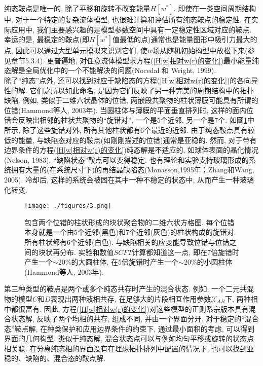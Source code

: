 纯态鞍点是唯一的, 除了平移和旋转不改变能量$H[w^*]$. 即使在一类空间周期结构中, 对于一个特定的复杂流体模型, 也很难计算和评估所有纯态鞍点的稳定性. 在实际应用中, 我们主要感兴趣的是模型参数空间中具有一定稳定性区域对应的鞍点. 幸运的是, 最稳定的鞍点(即$H[w^*]$值最低的点)通常也是能量图形中吸引力最大的点, 因此可以通过大型单元模拟来识别它们, 使$w$场从随机初始构型中放松下来(参见章节5.3.4). 更普遍地, 对任意流体模型求方程(\ref{H[w]相对w(r)的变化})最小能量纯态解是全局优化中的一个不能解决的问题(Nocedal 和 Wright, 1999). \\

除了“纯态”点外, 还可以找到对应于缺陷态的方程(\ref{H[w]相对w(r)的变化})的各向异性的解. 它们之所以如此命名, 是因为它们反映了另一种完美的周期结构中的拓扑缺陷. 例如, 类似于二维六状晶体的位错, 两嵌段共聚物的柱状薄膜可能具有所谓的位错(Hammond等人, 2003年). 当圆柱体与薄膜的平面垂直排列时, 这样的面内位错会反映出相邻的柱状共聚物的“旋错对”, 一个是5个近邻, 另一个是7个. 如圖\ref{方格图}中所示, 除了这些旋错对外, 所有其他柱状都有6个最近的近邻. 由于纯态鞍点具有较低的能量, 与缺陷态对应的鞍点(如刚刚描述的位错)通常是亚稳的. 然而, 对于带有边界条件的方程(\ref{H[w]相对w(r)的变化})纯态解是不适应的, 如球体表面的晶化情况(Nelson, 1983), “缺陷状态”鞍点可以变得稳定. 也有理论和实验支持玻璃形成的系统拥有大量的(在系统尺寸下)的再结晶缺陷态(Monasson,1995年；Zhang和Wang, 2005). 冷却后, 这样的系统会被困在其中一种不稳定的状态中, 从而产生一种玻璃化转变. \\
\begin{figure}[H]
        \centering
         \texttt{[image: ./figures/3.png]}
    \caption{包含两个位错的柱状形成的块状聚合物的二维六状方格图. 每个位错本身就是一个由5个近邻(黑色)和7个近邻(灰色)的柱状构成的旋错对. 所有柱状都有6个近邻(白色). 与缺陷相关的应变能导致位错与位错之间的块状再分布. 实验和数值$SCFT$计算都知道这一点, 即在7倍旋错时产生一个$\sim 20\%$的大圆柱体, 在5倍旋错时产生一个$\sim 20\%$的小圆柱体(Hammond等人, 2003年). } 
           \label{方格图}
\end{figure}


第三种类型的鞍点是两个或多个纯态共存时产生的混合状态. 例如, 一个二元共混物的模型$C$和$D$表现出两种液相共存, 在足够大的片段相互作用参数$\mathcal{X}_{AB}$下, 两种相中都很富有. 因此, 方程(\ref{H[w]相对w(r)的变化})对这些模型的正则系宗版本具有混合状态解, 反映了两个均相的共存, 组成不同, 并由一个界面分开. 对于稳定的“混合态”鞍点解, 在种类保护和应用边界条件的约束下, 通过最小面积的考虑, 可以得到界面的几何构型. 类似于纯态解, 混合状态点可以与例如均匀平移或旋转的状态点相关联. 在分离纯态相的界面没有在理想拓扑排列中配置的情况下, 也可以找到亚稳的、缺陷的、混合态的鞍点解. \\

